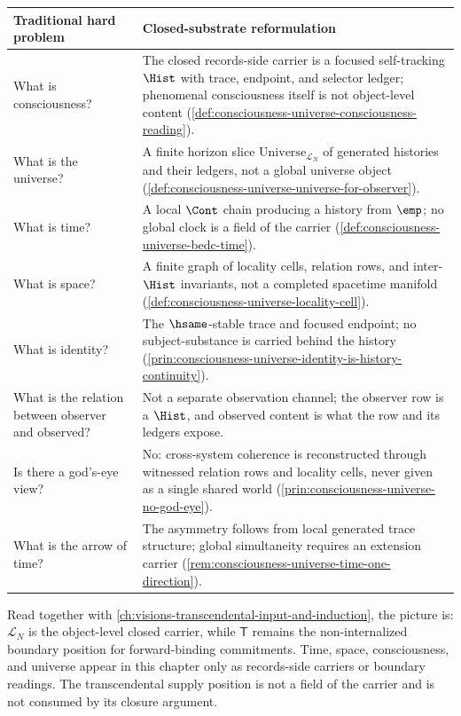 \begin{longtable}{p{}p{}}
\toprule
\textbf{Traditional hard problem} & \textbf{Closed-substrate reformulation} \\
\midrule
What is consciousness? & The closed records-side carrier is a focused self-tracking $\Hist$ with trace, endpoint, and selector ledger; phenomenal consciousness itself is not object-level content (\autoref{def:consciousness-universe-consciousness-reading}). \\
What is the universe? & A finite horizon slice $\mathrm{Universe}_{\mathcal{L}_N}$ of generated histories and their ledgers, not a global universe object (\autoref{def:consciousness-universe-universe-for-observer}). \\
What is time? & A local $\Cont$ chain producing a history from $\emp$; no global clock is a field of the carrier (\autoref{def:consciousness-universe-bedc-time}). \\
What is space? & A finite graph of locality cells, relation rows, and inter-$\Hist$ invariants, not a completed spacetime manifold (\autoref{def:consciousness-universe-locality-cell}). \\
What is identity? & The $\hsame$-stable trace and focused endpoint; no subject-substance is carried behind the history (\autoref{prin:consciousness-universe-identity-is-history-continuity}). \\
What is the relation between observer and observed? & Not a separate observation channel; the observer row is a $\Hist$, and observed content is what the row and its ledgers expose. \\
Is there a god's-eye view? & No: cross-system coherence is reconstructed through witnessed relation rows and locality cells, never given as a single shared world (\autoref{prin:consciousness-universe-no-god-eye}). \\
What is the arrow of time? & The asymmetry follows from local generated trace structure; global simultaneity requires an extension carrier (\autoref{rem:consciousness-universe-time-one-direction}). \\
\bottomrule
\end{longtable}

\begin{remark}
\label{rem:consciousness-universe-continuity-with-transcendental}
Read together with \autoref{ch:visions-transcendental-input-and-induction}, the picture is: $\mathcal{L}_N$ is the object-level closed carrier, while $\mathsf{T}$ remains the non-internalized boundary position for forward-binding commitments. Time, space, consciousness, and universe appear in this chapter only as records-side carriers or boundary readings. The transcendental supply position is not a field of the carrier and is not consumed by its closure argument.
\end{remark}

